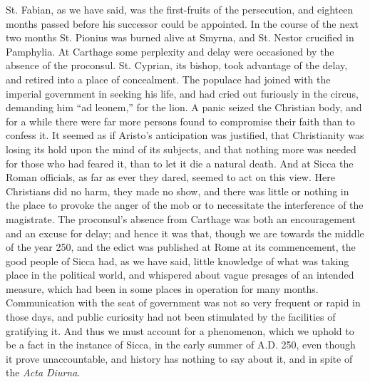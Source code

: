 St. Fabian, as we have said, was the first-fruits of the
persecution, and eighteen months passed before his successor could be
appointed. In the course of the next two months St. Pionius was burned
alive at Smyrna, and St. Nestor crucified in Pamphylia. At Carthage
some perplexity and delay were occasioned by the absence of the
proconsul. St. Cyprian, its bishop, took advantage of the delay, and
retired into a place of concealment. The populace had joined with the
imperial government in seeking his life, and had cried out furiously
in the circus, demanding him ``ad leonem,'' for the lion. A
panic seized the Christian body, and for a while there were far more
persons found to compromise their faith than to confess it. It seemed
as if Aristo's anticipation was justified, that Christianity was
losing its hold upon the mind of its subjects, and that nothing more
was needed for those who had feared it, than to let it die a
natural death. And at Sicca the Roman officials, as far as ever they
dared, seemed to act on this view. Here Christians did no harm, they
made no show, and there was little or nothing in the place to provoke
the anger of the mob or to necessitate the interference of the
magistrate. The proconsul's absence from Carthage was both an
encouragement and an excuse for delay; and hence it was that, though
we are towards the middle of the year 250, and the edict was published
at Rome at its commencement, the good people of Sicca had, as we have
said, little knowledge of what was taking place in the political
world, and whispered about vague presages of an intended measure,
which had been in some places in operation for many months.
Communication with the seat of government was not so very frequent or
rapid in those days, and public curiosity had not been stimulated by
the facilities of gratifying it. And thus we must account for a
phenomenon, which we uphold to be a fact in the instance of Sicca, in
the early summer of A.D. 250, even though it prove unaccountable, and
history has nothing to say about it, and in spite of the \emph{Acta
Diurna}.

